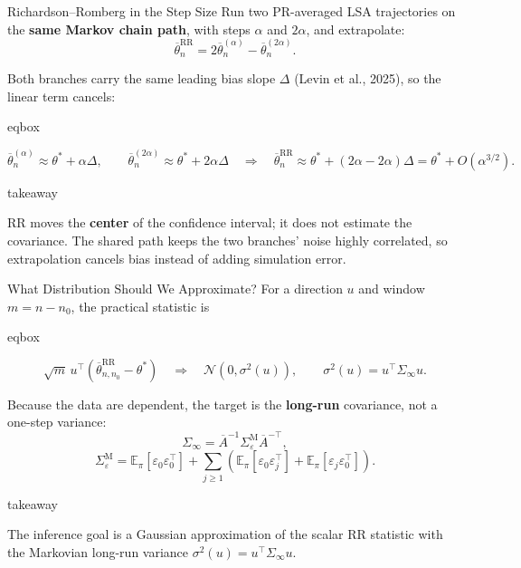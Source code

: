 \documentclass[11pt,aspectratio=169,xcolor=table]{beamer}
\newcommand{\tealaccent}[1]{\textcolor{ThesisTeal}{\bfseries #1}}
\newcommand{\RR}{\mathrm{RR}}
\newcommand{\MC}{\mathrm{M}}
\newcommand{\Abar}{\overline{A}}
\newcommand{\eps}{\varepsilon}
\newenvironment{eqbox}
  {\begin{beamercolorbox}[wd=\linewidth,sep=0.48em,center,rounded=true]{eqbox}%
   \begin{minipage}{0.97\linewidth}\centering}
  {\end{minipage}\end{beamercolorbox}}
\newenvironment{takeawaybox}
  {\begin{beamercolorbox}[wd=\linewidth,sep=0.52em,leftskip=0.25em,rightskip=0.25em,rounded=true]{takeaway}%
   \begin{minipage}{0.96\linewidth}%
   \llap{{\color{ThesisGreen}\rule{2.5pt}{2.6ex}}\hspace{0.5em}}}
  {\end{minipage}\end{beamercolorbox}}
\begin{document}
\begin{frame}{Richardson--Romberg in the Step Size}
\small
Run two PR-averaged LSA trajectories on the \tealaccent{same Markov chain path},
with steps $\alpha$ and $2\alpha$, and extrapolate:
\[
  \overline\theta_n^\RR
  =2\overline\theta_n^{(\alpha)}-\overline\theta_n^{(2\alpha)}.
\]

Both branches carry the same leading bias slope $\Delta$ (Levin et al., 2025),
so the linear term cancels:

\begin{eqbox}
\[
  \overline\theta_n^{(\alpha)}\approx\theta^*+\alpha\Delta,\qquad
  \overline\theta_n^{(2\alpha)}\approx\theta^*+2\alpha\Delta
  \quad\Longrightarrow\quad
  \overline\theta_n^\RR
  \approx\theta^*+(2\alpha-2\alpha)\Delta
  =\theta^*+O(\alpha^{3/2}).
\]
\end{eqbox}

\vspace{0.55em}
\begin{takeawaybox}
RR moves the \textbf{center} of the confidence interval; it does not estimate
the covariance. The shared path keeps the two branches' noise highly
correlated, so extrapolation cancels bias instead of adding simulation error.
\end{takeawaybox}
\end{frame}

\begin{frame}[shrink=6]{What Distribution Should We Approximate?}
\small
For a direction $u$ and window $m=n-n_0$, the practical statistic is

\begin{eqbox}
\[
  \sqrt m\,u^\top(\overline\theta_{n,n_0}^\RR-\theta^*)
  \quad\Longrightarrow\quad
  \mathcal N(0,\sigma^2(u)),
  \qquad \sigma^2(u)=u^\top\Sigma_\infty u.
\]
\end{eqbox}

\vspace{0.55em}
Because the data are dependent, the target is the \tealaccent{long-run}
covariance, not a one-step variance:
\[
  \Sigma_\infty
  =\Abar^{-1}\Sigma_\eps^\MC\Abar^{-\top},
\]
\[
  \Sigma_\eps^\MC
  =\mathbb E_\pi[\eps_0\eps_0^\top]
   +\sum_{j\geq1}\left(
      \mathbb E_\pi[\eps_0\eps_j^\top]
      +\mathbb E_\pi[\eps_j\eps_0^\top]\right).
\]

\vspace{0.45em}
\begin{takeawaybox}
The inference goal is a Gaussian approximation of the scalar RR statistic
with the Markovian long-run variance
$\sigma^2(u)=u^\top\Sigma_\infty u$.
\end{takeawaybox}
\end{frame}
\end{document}
